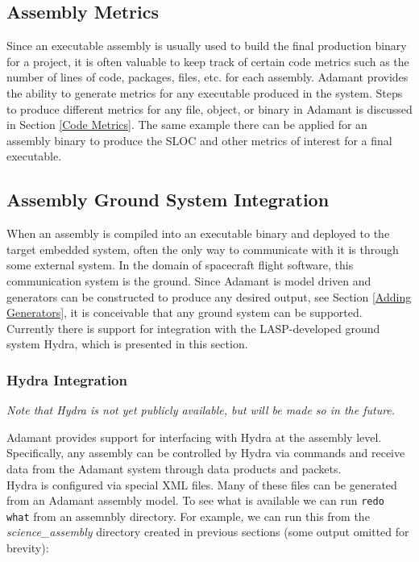 \subsection{Assembly Metrics}

Since an executable assembly is usually used to build the final production binary for a project, it is often valuable to keep track of certain code metrics such as the number of lines of code, packages, files, etc. for each assembly. Adamant provides the ability to generate metrics for any executable produced in the system. Steps to produce different metrics for any file, object, or binary in Adamant is discussed in Section \ref{Code Metrics}. The same example there can be applied for an assembly binary to produce the SLOC and other metrics of interest for a final executable.

\subsection{Assembly Ground System Integration}

When an assembly is compiled into an executable binary and deployed to the target embedded system, often the only way to communicate with it is through some external system. In the domain of spacecraft flight software, this communication system is the ground. Since Adamant is model driven and generators can be constructed to produce any desired output, see Section \ref{Adding Generators}, it is conceivable that any ground system can be supported. Currently there is support for integration with the LASP-developed ground system Hydra, which is presented in this section.

\subsubsection{Hydra Integration}

\textit{Note that Hydra is not yet publicly available, but will be made so in the future.}

Adamant provides support for interfacing with Hydra at the assembly level. Specifically, any assembly can be controlled by Hydra via commands and receive data from the Adamant system through data products and packets. \\

Hydra is configured via special XML files. Many of these files can be generated from an Adamant assembly model. To see what is available we can run \texttt{redo what} from an assemnbly directory. For example, we can run this from the \textit{science\_assembly} directory created in previous sections (some output omitted for brevity):

